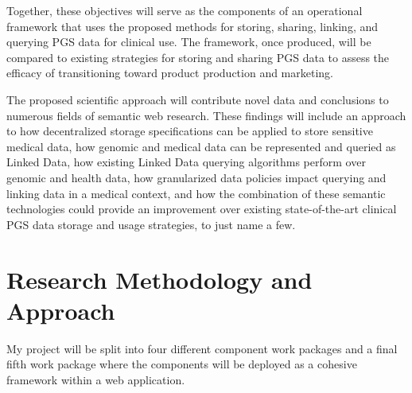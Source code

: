 \documentclass[runningheads]{llncs}
\begin{document}
Together, these objectives will serve as the components of an operational framework that uses the proposed methods for storing, sharing, linking, and querying PGS data for clinical use. The framework, once produced, will be compared to existing strategies for storing and sharing PGS data to assess the efficacy of transitioning toward product production and marketing.

The proposed scientific approach will contribute novel data and conclusions to numerous fields of semantic web research. These findings will include an approach to how decentralized storage specifications can be applied to store sensitive medical data, how genomic and medical data can be represented and queried as Linked Data, how existing Linked Data querying algorithms perform over genomic and health data, how granularized data policies impact querying and linking data in a medical context, and how the combination of these semantic technologies could provide an improvement over existing state-of-the-art clinical PGS data storage and usage strategies, to just name a few.


\section{Research Methodology and Approach}

My project will be split into four different component work packages and a final fifth work package where the components will be deployed as a cohesive framework within a web application. 
\end{document}
